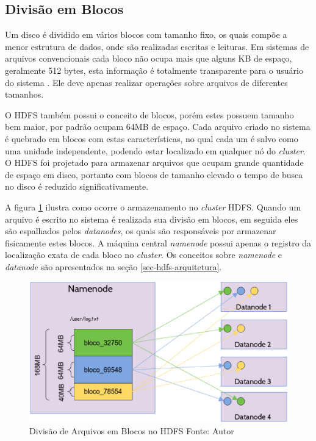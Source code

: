 \subsection{Divisão em Blocos}

Um disco é dividido em vários blocos com tamanho fixo, os quais compõe a menor estrutura de dados, onde são realizadas escritas e leituras. Em sistemas de arquivos convencionais cada bloco não ocupa mais que alguns KB de espaço, geralmente 512 bytes, esta informação é totalmente transparente para o usuário do sistema \cite{white2012}. Ele deve apenas realizar operações sobre arquivos de diferentes tamanhos.

O HDFS também possui o conceito de blocos, porém estes possuem tamanho bem maior, por padrão ocupam 64MB de espaço. Cada arquivo criado no sistema é quebrado em blocos com estas características, no qual cada um é salvo como uma unidade independente, podendo estar localizado em qualquer nó do \textit{cluster}. O HDFS foi projetado para armazenar arquivos que ocupam grande quantidade de espaço em disco, portanto com blocos de tamanho elevado o tempo de busca no disco é reduzido significativamente.

A figura \ref{fig-hdfs-blocos} ilustra como ocorre o armazenamento no \textit{cluster} HDFS. Quando um arquivo é escrito no sistema é realizada sua divisão em blocos, em seguida eles são espalhados pelos \textit{datanodes}, os quais são responsáveis por armazenar fisicamente estes blocos. A máquina central \textit{namenode} possui apenas o registro da localização exata de cada bloco no \textit{cluster}. Os conceitos sobre \textit{namenode} e \textit{datanode} são apresentados na seção \ref{sec-hdfs-arquitetura}.

\begin{figure}[ht!]
	\centering
	\includegraphics[keepaspectratio=true,scale=0.5]
	  {figuras/hdfs-blocos.eps}
	\caption[Divisão de Arquivos em Blocos no HDFS]{Divisão de Arquivos em Blocos no HDFS
	\protect\linebreak Fonte: Autor}
	\label{fig-hdfs-blocos}
\end{figure}
\FloatBarrier

